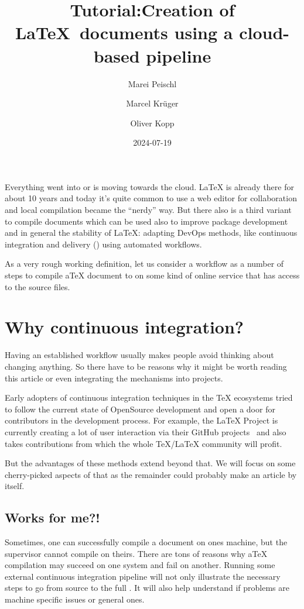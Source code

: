 \documentclass[final]{ltugboat}
\title[TUG2024: LaTeX CI/CD]{Tutorial:\newline Creation of \LaTeX\ documents using a cloud-based pipeline}
\date{2024-07-19}
\author{Marei Peischl}
\author{Marcel Krüger}
\author{Oliver Kopp}
\begin{document}
\maketitle

Everything went into or is moving towards the cloud.
\LaTeX{} is already there for about 10 years and today it's quite common to use a web editor for collaboration and local compilation became the \enquote{nerdy} way.
But there also is a third variant to compile documents which can be used also to improve package development and in general the stability of \LaTeX:
adapting DevOps methods, like continuous integration and delivery () using automated workflows.

As a very rough working definition, let us consider a  workflow as a number of steps to compile a\TeX{} document to  on some kind of online service that has access to the source files.

\section{Why continuous integration?}
Having an established workflow usually makes people avoid thinking about changing anything.
So there have to be reasons why it might be worth reading this article or even integrating the mechanisms into projects.

Early adopters of continuous integration techniques in the \TeX{} ecosystems tried to follow the current state of OpenSource development and open a door for contributors in the development process.
For example, the \LaTeX{} Project is currently creating a lot of user interaction via their GitHub projects~\cite{latex3-github} and also takes contributions from which the whole \TeX/\LaTeX{} community will profit.

But the advantages of these methods extend beyond that. We will focus on some cherry-picked aspects of that as the remainder could probably make an article by itself.

\subsection{Works for me?!}
Sometimes, one can successfully compile a document on ones machine, but the supervisor cannot compile on theirs.
There are tons of reasons why a\TeX{} compilation may succeed on one system and fail on another.
Running some external continuous integration pipeline will not only illustrate the necessary steps to go from source to the full .
It will also help understand if problems are machine specific issues or general ones.
\end{document}
